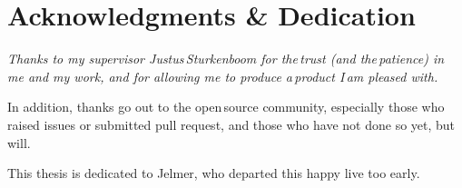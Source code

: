 
\begingroup
  \let\clearpage\relax
  \let\cleardoublepage\relax
  \chapter*{Acknowledgments \& Dedication}

  \itshape
  Thanks to my supervisor Justus\,Sturkenboom for the\,trust (and
    the\,patience) in me and my work, and for allowing me to produce
    a\,product I\,am pleased with.

  \medskip
  \noindent In addition, thanks go out to the open\,source community,
    especially those who raised issues or submitted pull request, and those
    who have not done so yet, but will.

  \medskip
  \noindent This thesis is dedicated to Jelmer, who departed this happy live
    too early.
\endgroup
